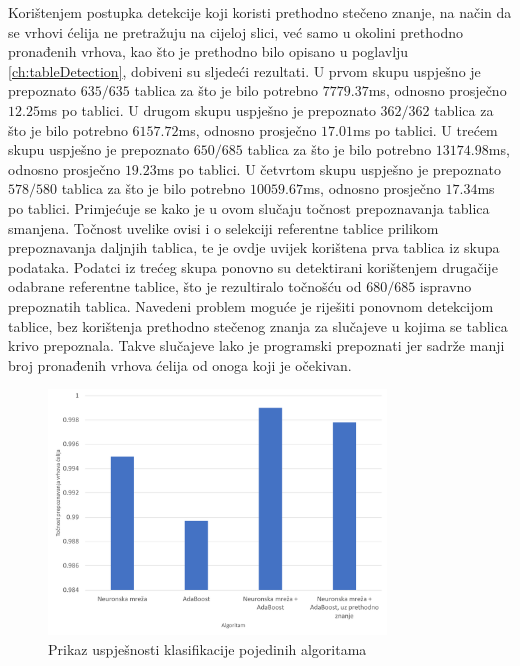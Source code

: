 \documentclass[times, utf8, zavrsni, numeric]{fer}
\begin{document}
Korištenjem postupka detekcije koji koristi prethodno stečeno znanje, na način da se vrhovi ćelija ne pretražuju na cijeloj slici, već samo u okolini prethodno pronađenih vrhova, kao što je prethodno bilo opisano u poglavlju \ref{ch:tableDetection}, dobiveni su sljedeći rezultati.
U prvom skupu uspješno je prepoznato $635/635$ tablica za što je bilo potrebno $7779.37$ms, odnosno prosječno $12.25$ms po tablici.
U drugom skupu uspješno je prepoznato $362/362$ tablica za što je bilo potrebno $6157.72$ms, odnosno prosječno $17.01$ms po tablici.
U trećem skupu uspješno je prepoznato $650/685$ tablica za što je bilo potrebno $13174.98$ms, odnosno prosječno $19.23$ms po tablici.
U četvrtom skupu uspješno je prepoznato $578/580$ tablica za što je bilo potrebno $10059.67$ms, odnosno prosječno $17.34$ms po tablici.
Primjećuje se kako je u ovom slučaju točnost prepoznavanja tablica smanjena.
Točnost uvelike ovisi i o selekciji referentne tablice prilikom prepoznavanja daljnjih tablica, te je ovdje uvijek korištena prva tablica iz skupa podataka.
Podatci iz trećeg skupa ponovno su detektirani korištenjem drugačije odabrane referentne tablice, što je rezultiralo točnošću od $680/685$ ispravno prepoznatih tablica.
Navedeni problem moguće je riješiti ponovnom detekcijom tablice, bez korištenja prethodno stečenog znanja za slučajeve u kojima se tablica krivo prepoznala.
Takve slučajeve lako je programski prepoznati jer sadrže manji broj pronađenih vrhova ćelija od onoga koji je očekivan.\\

\begin{figure}[ht!]
    \centering
    \includegraphics[width=0.8\textwidth]{Images/SuccessComparison}
    \captionsetup{justification=centering}
    \caption{Prikaz uspješnosti klasifikacije pojedinih algoritama}
    \label{fig:compareSuccess}
\end{figure}
\end{document}
